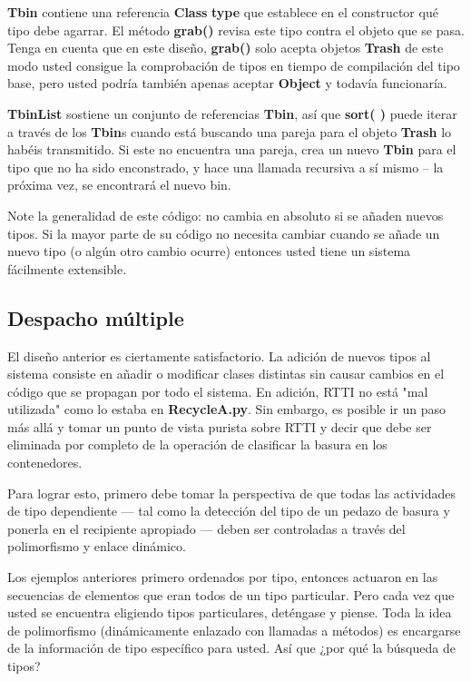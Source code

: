 \documentclass{article}
\begin{document}
\textbf{Tbin} contiene una referencia \textbf{Class} \textbf{type} que establece en el constructor qué tipo debe agarrar. El método \textbf{grab()} revisa este tipo contra el objeto que se pasa. Tenga en cuenta que en este diseño, \textbf{grab()} solo acepta objetos \textbf{Trash} de este modo usted consigue la comprobación de tipos en tiempo de compilación del tipo base, pero usted podría también apenas aceptar \textbf{Object} y todavía funcionaría.      \newline

\textbf{TbinList} sostiene un conjunto de referencias \textbf{Tbin}, así que \textbf{sort( )} puede iterar a través de los \textbf{Tbin}s cuando está buscando una pareja para el objeto \textbf{Trash} lo habéis transmitido. Si este no encuentra una pareja, crea un nuevo \textbf{Tbin} para el tipo que no ha sido enconstrado, y hace una llamada recursiva a sí mismo – la próxima vez, se encontrará el nuevo bin.

Note la generalidad de este código: no cambia en absoluto si se añaden nuevos tipos. Si la mayor parte de su código no necesita cambiar cuando se añade un nuevo tipo (o algún otro cambio ocurre) entonces usted tiene un sistema fácilmente extensible.

\newpage

\subsection{Despacho múltiple}

El diseño anterior es ciertamente satisfactorio. La adición de nuevos tipos al sistema consiste en añadir o modificar clases distintas sin causar cambios en el código que se propagan por todo el sistema. En adición, RTTI no está "mal utilizada" como lo estaba en \textbf{RecycleA.py}. Sin embargo, es posible ir un paso más allá y tomar un punto de vista purista sobre RTTI y decir que debe ser eliminada por completo de la operación de clasificar la basura en los contenedores. \newline

Para lograr esto, primero debe tomar la perspectiva de que todas las actividades de tipo dependiente — tal como la detección del tipo de un pedazo de basura y ponerla en el recipiente apropiado — deben ser controladas a través del polimorfismo y enlace dinámico. \newline

Los ejemplos anteriores primero ordenados por tipo,  entonces actuaron en las secuencias de elementos que eran todos de un tipo particular. Pero cada vez que usted se encuentra eligiendo tipos particulares, deténgase y piense. 
Toda la idea de polimorfismo (dinámicamente enlazado con llamadas a métodos) es encargarse de la información de tipo específico para usted. Así que ¿por qué la búsqueda de tipos?      \newline
\end{document}
